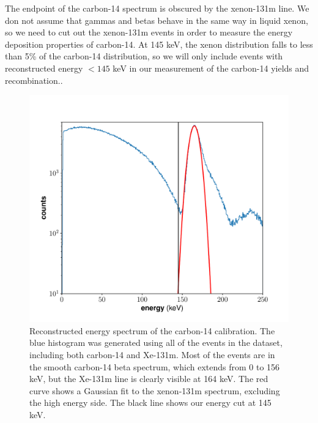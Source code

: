 The endpoint of the carbon-14 spectrum is obscured by the xenon-131m line. We don not assume that gammas and betas behave in the same way in liquid xenon, so we need to cut out the xenon-131m events in order to measure the energy deposition properties of carbon-14. At 145 keV, the xenon distribution falls to less than 5\% of the carbon-14 distribution, so we will only include events with reconstructed energy $<145$ keV in our measurement of the carbon-14 yields and recombination..
\begin{figure}[h!]
\centering
  \includegraphics[width=\textwidth]{Figures/C14_spec_init.pdf}
\caption{Reconstructed energy spectrum of the carbon-14 calibration. The blue histogram was generated using all of the events in the dataset, including both carbon-14 and Xe-131m. Most of the events are in the smooth carbon-14 beta spectrum, which extends from 0 to 156 keV, but the Xe-131m line is clearly visible at 164 keV. The red curve shows a Gaussian fit to the xenon-131m spectrum, excluding the high energy side. The black line shows our energy cut at 145 keV.}
\label{fig:c14Ecut}
\end{figure}



